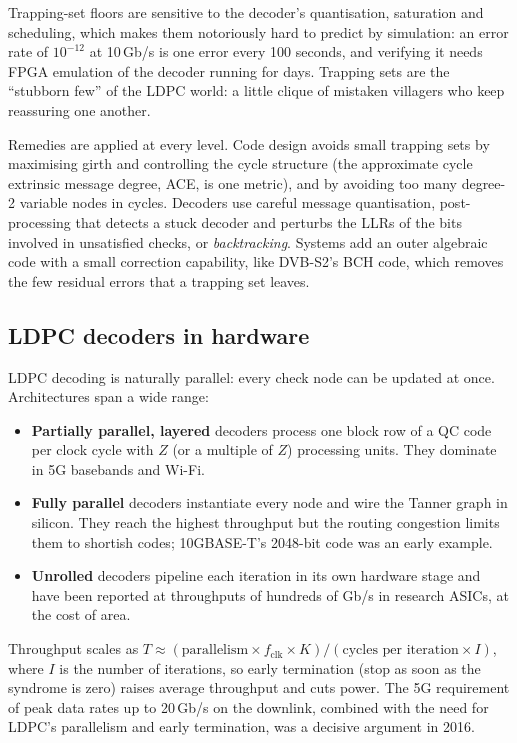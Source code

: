 Trapping-set floors are sensitive to the decoder's quantisation, saturation and scheduling, which
makes them notoriously hard to predict by simulation: an error rate of $10^{-12}$ at 10\,Gb/s is one
error every 100 seconds, and verifying it needs FPGA emulation of the decoder running for days.
Trapping sets are the ``stubborn few'' of the LDPC world: a little clique of mistaken villagers who
keep reassuring one another.

Remedies are applied at every level. Code design avoids small trapping sets by maximising girth and
controlling the cycle structure (the approximate cycle extrinsic message degree, ACE, is one metric),
and by avoiding too many degree-2 variable nodes in cycles. Decoders use careful message
quantisation, post-processing that detects a stuck decoder and perturbs the LLRs of the bits
involved in unsatisfied checks, or \emph{backtracking}. Systems add an outer algebraic code with a
small correction capability, like DVB-S2's BCH code, which removes the few residual errors that a
trapping set leaves.


\subsection{LDPC decoders in hardware}

LDPC decoding is naturally parallel: every check node can be updated at once. Architectures span a
wide range:
\begin{itemize}
\item \textbf{Partially parallel, layered} decoders process one block row of a QC code per clock
cycle with $Z$ (or a multiple of $Z$) processing units. They dominate in 5G basebands and Wi-Fi.
\item \textbf{Fully parallel} decoders instantiate every node and wire the Tanner graph in silicon.
They reach the highest throughput but the routing congestion limits them to shortish codes;
10GBASE-T's 2048-bit code was an early example.
\item \textbf{Unrolled} decoders pipeline each iteration in its own hardware stage and have been
reported at throughputs of hundreds of Gb/s in research ASICs, at the cost of area.
\end{itemize}
Throughput scales as $T\approx(\text{parallelism}\times f_{\text{clk}}\times K)/(\text{cycles per
iteration}\times I)$, where $I$ is the number of iterations, so early termination (stop as soon as
the syndrome is zero) raises average throughput and cuts power. The 5G requirement of peak data rates
up to 20\,Gb/s on the downlink, combined with the need for LDPC's parallelism and early termination,
was a decisive argument in 2016.

